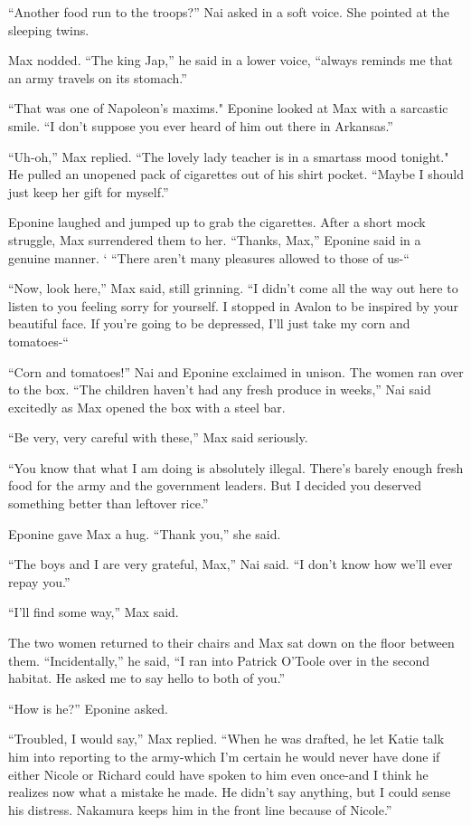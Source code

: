 \documentclass[]{article}
\begin{document}
{{“Another food run to the troops?” Nai asked in a soft voice.  She pointed at the sleeping twins.

Max nodded.  “The king Jap,” he said in a lower voice, “always reminds me that an army travels on its stomach.”

“That was one of Napoleon’s maxims."  Eponine looked at Max with a sarcastic smile.  “I don’t suppose you ever heard of him out there in Arkansas.”

“Uh-oh,” Max replied.  “The lovely lady teacher is in a smartass mood tonight."  He pulled an unopened pack of cigarettes out of his shirt pocket.  “Maybe I should just keep her gift for myself.”

Eponine laughed and jumped up to grab the cigarettes.  After a short mock struggle, Max surrendered them to her.  “Thanks, Max,” Eponine said in a genuine manner.  ‘ “There aren’t many pleasures allowed to those of us-“

“Now, look here,” Max said, still grinning.  “I didn’t come all the way out here to listen to you feeling sorry for yourself.  I stopped in Avalon to be inspired by your beautiful face.  If you’re going to be depressed, I’ll just take my corn and tomatoes-“

“Corn and tomatoes!” Nai and Eponine exclaimed in unison.  The women ran over to the box.  “The children haven’t had any fresh produce in weeks,” Nai said excitedly as Max opened the box with a steel bar.

“Be very, very careful with these,” Max said seriously.

“You know that what I am doing is absolutely illegal.  There’s barely enough fresh food for the army and the government leaders.  But I decided you deserved something better than leftover rice.”

Eponine gave Max a hug.  “Thank you,” she said.

“The boys and I are very grateful, Max,” Nai said.  “I don’t know how we’ll ever repay you.”

“I'll find some way,” Max said.

The two women returned to their chairs and Max sat down on the floor between them.  “Incidentally,” he said, “I ran into Patrick O’Toole over in the second habitat.  He asked me to say hello to both of you.”

“How is he?” Eponine asked.

“Troubled, I would say,” Max replied.  “When he was drafted, he let Katie talk him into reporting to the army-which I’m certain he would never have done if either Nicole or Richard could have spoken to him even once-and I think he realizes now what a mistake he made.  He didn’t say anything, but I could sense his distress.  Nakamura keeps him in the front line because of Nicole.”

}}
\end{document}
